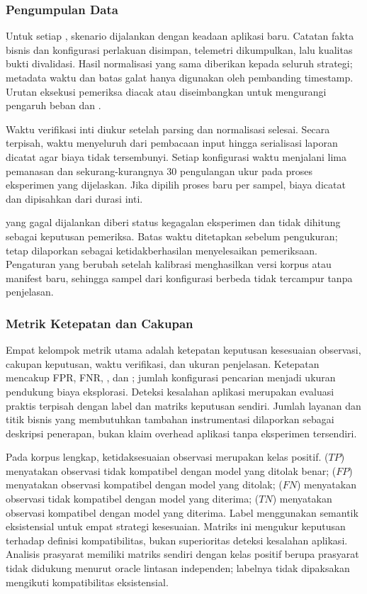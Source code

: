 \subsubsection{Pengumpulan Data}
Untuk setiap , skenario dijalankan dengan keadaan aplikasi baru. Catatan fakta bisnis dan konfigurasi perlakuan disimpan, telemetri dikumpulkan, lalu kualitas bukti divalidasi. Hasil normalisasi yang sama diberikan kepada seluruh strategi; metadata waktu dan batas galat hanya digunakan oleh pembanding timestamp. Urutan eksekusi pemeriksa diacak atau diseimbangkan untuk mengurangi pengaruh beban dan .

Waktu verifikasi inti diukur setelah parsing dan normalisasi selesai. Secara terpisah, waktu menyeluruh dari pembacaan input hingga serialisasi laporan dicatat agar biaya  tidak tersembunyi. Setiap konfigurasi waktu menjalani lima pemanasan dan sekurang-kurangnya 30 pengulangan ukur pada proses eksperimen yang dijelaskan. Jika dipilih proses baru per sampel, biaya  dicatat dan dipisahkan dari durasi inti.

 yang gagal dijalankan diberi status kegagalan eksperimen dan tidak dihitung sebagai keputusan pemeriksa. Batas waktu ditetapkan sebelum pengukuran;  tetap dilaporkan sebagai ketidakberhasilan menyelesaikan pemeriksaan. Pengaturan yang berubah setelah kalibrasi menghasilkan versi korpus atau manifest baru, sehingga sampel dari konfigurasi berbeda tidak tercampur tanpa penjelasan.

\subsubsection{Metrik Ketepatan dan Cakupan}
Empat kelompok metrik utama adalah ketepatan keputusan kesesuaian observasi, cakupan keputusan, waktu verifikasi, dan ukuran penjelasan. Ketepatan mencakup FPR, FNR, , dan ; jumlah konfigurasi pencarian menjadi ukuran pendukung biaya eksplorasi. Deteksi kesalahan aplikasi merupakan evaluasi praktis terpisah dengan label dan matriks keputusan sendiri. Jumlah layanan dan titik bisnis yang membutuhkan tambahan instrumentasi dilaporkan sebagai deskripsi penerapan, bukan klaim overhead aplikasi tanpa eksperimen tersendiri.

Pada korpus lengkap, ketidaksesuaian observasi merupakan kelas positif.  ($TP$) menyatakan observasi tidak kompatibel dengan model yang ditolak benar;  ($FP$) menyatakan observasi kompatibel dengan model yang ditolak;  ($FN$) menyatakan observasi tidak kompatibel dengan model yang diterima;  ($TN$) menyatakan observasi kompatibel dengan model yang diterima. Label menggunakan semantik eksistensial untuk empat strategi kesesuaian. Matriks ini mengukur keputusan terhadap definisi kompatibilitas, bukan superioritas deteksi kesalahan aplikasi. Analisis prasyarat memiliki matriks sendiri dengan kelas positif berupa prasyarat tidak didukung menurut oracle lintasan independen; labelnya tidak dipaksakan mengikuti kompatibilitas eksistensial.

